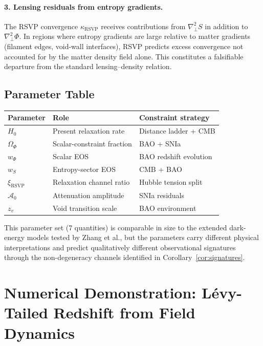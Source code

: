 \documentclass[12pt,a4paper]{article}
\theoremstyle{remark}
\newcommand{\Acal}{\mathcal{A}}
\begin{document}
\paragraph{3. Lensing residuals from entropy gradients.}
The RSVP convergence $\kappa_{\mathrm{RSVP}}$ receives contributions from
$\nabla_\perp^2 S$ in addition to $\nabla_\perp^2\Phi$. In regions where
entropy gradients are large relative to matter gradients (filament edges,
void-wall interfaces), RSVP predicts excess convergence not accounted for by
the matter density field alone. This constitutes a falsifiable departure from
the standard lensing--density relation.

\subsection{Parameter Table}

\begin{center}
\begin{tabular}{lll}
\toprule
Parameter & Role & Constraint strategy \\
\midrule
$H_0$ & Present relaxation rate & Distance ladder + CMB \\
$\Omega_\Phi$ & Scalar-constraint fraction & BAO + SNIa \\
$w_\Phi$ & Scalar EOS & BAO redshift evolution \\
$w_S$ & Entropy-sector EOS & CMB + BAO \\
$\xi_{\mathrm{RSVP}}$ & Relaxation channel ratio & Hubble tension split \\
$\Acal_0$ & Attenuation amplitude & SNIa residuals \\
$z_v$ & Void transition scale & BAO environment \\
\bottomrule
\end{tabular}
\end{center}

This parameter set (7 quantities) is comparable in size to the extended
dark-energy models tested by Zhang et al., but the parameters carry different
physical interpretations and predict qualitatively different observational
signatures through the non-degeneracy channels identified in
Corollary~\ref{cor:signatures}.


\section{Numerical Demonstration: Lévy-Tailed Redshift from Field Dynamics}
\label{app:simulation}
\end{document}
